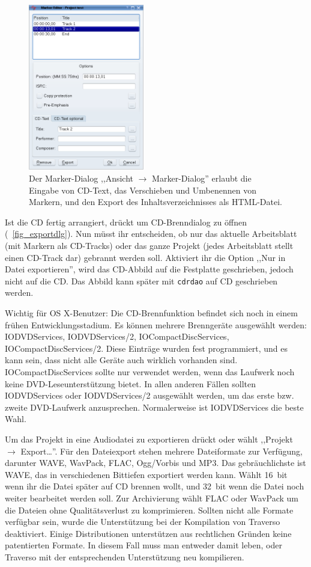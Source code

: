 \begin{figure}[ht]
 \centering\includegraphics[width=0.45\textwidth]{../images/marker-editor}
 \caption{Der Marker-Dialog ,,Ansicht $\rightarrow$ Marker-Dialog'' erlaubt die Eingabe von CD-Text, das Verschieben und Umbenennen von Markern, und den Export des Inhaltsverzeichnisses als HTML-Datei.}
 \label{fig_marker-editor}
\end{figure}

Ist die CD fertig arrangiert, drückt  um CD-Brenndialog zu öffnen (\FigB~\ref{fig_exportdlg}). Nun müsst ihr entscheiden, ob nur das aktuelle Arbeitsblatt (mit Markern als CD-Tracks) oder das ganze Projekt (jedes Arbeitsblatt stellt einen CD-Track dar) gebrannt werden soll. Aktiviert ihr die Option ,,Nur in Datei exportieren'', wird das CD-Abbild auf die Festplatte geschrieben, jedoch nicht auf die CD. Das Abbild kann später mit \texttt{cdrdao} auf CD geschrieben werden.

Wichtig für OS X-Benutzer: Die CD-Brennfunktion befindet sich noch in einem frühen Entwicklungsstadium. Es können mehrere Brenngeräte ausgewählt werden: IODVDServices, IODVDServices/2, IOCompactDiscServices, IOCompactDiscServices/2. Diese Einträge wurden fest programmiert, und es kann sein, dass nicht alle Geräte auch wirklich vorhanden sind. IOCompactDiscServices sollte nur verwendet werden, wenn das Laufwerk noch keine DVD-Leseunterstützung bietet. In allen anderen Fällen sollten IODVDServices oder IODVDServices/2 ausgewählt werden, um das erste bzw. zweite DVD-Laufwerk anzusprechen. Normalerweise ist IODVDServices die beste Wahl.

Um das Projekt in eine Audiodatei zu exportieren drückt  oder wählt ,,Projekt $\rightarrow$ Export\dots''. Für den Dateiexport stehen mehrere Dateiformate zur Verfügung, darunter WAVE, WavPack, FLAC, Ogg/Vorbis und MP3. Das gebräuchlichste ist WAVE, das in verschiedenen Bittiefen exportiert werden kann. Wählt 16~bit wenn ihr die Datei später auf CD brennen wollt, und 32~bit wenn die Datei noch weiter bearbeitet werden soll. Zur Archivierung wählt FLAC oder WavPack um die Dateien ohne Qualitätsverlust zu komprimieren. Sollten nicht alle Formate verfügbar sein, wurde die Unterstützung bei der Kompilation von Traverso deaktiviert. Einige Distributionen unterstützen aus rechtlichen Gründen keine patentierten Formate. In diesem Fall muss man entweder damit leben, oder Traverso mit der entsprechenden Unterstützung neu kompilieren.

